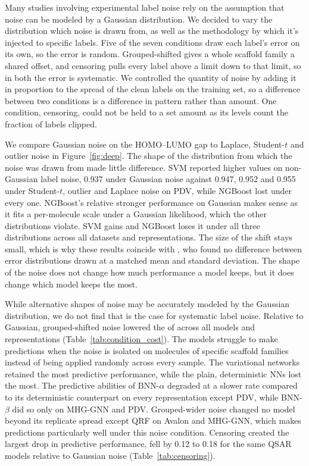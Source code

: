 Many studies involving experimental label noise rely on the assumption that noise can be modeled by a Gaussian distribution. We decided to vary the distribution which noise is drawn from, as well as the methodology by which it's injected to specific labels. Five of the seven conditions draw each label's error on its own, so the error is random. Grouped-shifted gives a whole scaffold family a shared offset, and censoring pulls every label above a limit down to that limit, so in both the error is systematic. We controlled the quantity of noise by adding it in proportion to the spread of the clean labels on the training set, so a difference between two conditions is a difference in pattern rather than amount. One condition, censoring, could not be held to a set amount as its levels count the fraction of labels clipped.

We compare Gaussian noise on the HOMO--LUMO gap to Laplace, Student-$t$ and outlier noise in Figure~\ref{fig:deep}. The shape of the distribution from which the noise was drawn from made little difference. SVM reported higher \aucnorm{} values on non-Gaussian label noise, 0.937 under Gaussian noise against 0.947, 0.952 and 0.955 under Student-$t$, outlier and Laplace noise on PDV, while NGBoost lost \aucnorm{} under every one. NGBoost's relative stronger performance on Gaussian makes sense as it fits a per-molecule scale under a Gaussian likelihood, which the other distributions violate. SVM gains \aucnorm{} and NGBoost loses it under all three distributions across all datasets and representations. The size of the shift stays small, which is why these results coincide with \citet{Heid2023}, who found no difference between error distributions drawn at a matched mean and standard deviation. The shape of the noise does not change how much performance a model keeps, but it does change which model keeps the most.

While alternative shapes of noise may be accurately modeled by the Gaussian distribution, we do not find that is the case for systematic label noise. Relative to Gaussian, grouped-shifted noise lowered the \aucnorm{} of across all models and representations (Table~\ref{tab:condition_cost}). The models struggle to make predictions when the noise is isolated on molecules of specific scaffold families instead of being applied randomly across every sample. The variational networks retained the most predictive performance, while the plain, deterministic NNs lost the most. The predictive abilities of BNN-$\alpha$ degraded at a slower rate compared to its deterministic counterpart on every representation except PDV, while BNN-$\beta$ did so only on MHG-GNN and PDV. Grouped-wider noise changed no model beyond its replicate spread except QRF on Avalon and MHG-GNN, which makes predictions particularly well under this noise condition.  Censoring created the largest drop in predictive performance, \aucnorm{} fell by 0.12 to 0.18 for the same QSAR models relative to Gaussian noise (Table~\ref{tab:censoring}).

